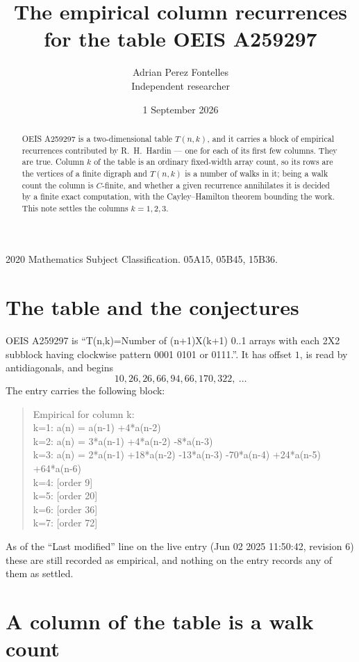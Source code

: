 \documentclass[11pt,a4paper]{article}
\title{The empirical column recurrences for the table OEIS A259297}
\author{Adrian Perez Fontelles\\ \small Independent researcher}
\date{1 September 2026}
\theoremstyle{plain}
\theoremstyle{definition}
\begin{document}
\maketitle

\begin{abstract}
OEIS A259297 is a two-dimensional table $T(n,k)$, and it carries a block of empirical
recurrences contributed by R.~H.~Hardin --- one for each of its first few columns. They are
true. Column $k$ of the table is an ordinary fixed-width array count, so its rows are the
vertices of a finite digraph and $T(n,k)$ is a number of walks in it; being a walk count the
column is $C$-finite, and whether a given recurrence annihilates it is decided by a finite
exact computation, with the Cayley--Hamilton theorem bounding the work. This note settles the columns $k=1, 2, 3$.
\end{abstract}

\noindent\small 2020 Mathematics Subject Classification. 05A15, 05B45, 15B36.\normalsize

\section{The table and the conjectures}

OEIS A259297 is ``T(n,k)=Number of (n+1)X(k+1) 0..1 arrays with each 2X2 subblock having clockwise pattern 0001 0101 or 0111.''. It has offset $1$, is
read by antidiagonals, and begins
\[
10, 26, 26, 66, 94, 66, 170, 322,\ \dots
\]
The entry carries the following block:
\begin{quote}\small
Empirical for column k:\\
k=1: a(n) = a(n-1) +4*a(n-2)\\
k=2: a(n) = 3*a(n-1) +4*a(n-2) -8*a(n-3)\\
k=3: a(n) = 2*a(n-1) +18*a(n-2) -13*a(n-3) -70*a(n-4) +24*a(n-5) +64*a(n-6)\\
k=4: [order 9]\\
k=5: [order 20]\\
k=6: [order 36]\\
k=7: [order 72]\\
\end{quote}
As of the ``Last modified'' line on the live entry (Jun 02 2025 11:50:42, revision 6) these are still
recorded as empirical, and nothing on the entry records any of them as settled.

\section{A column of the table is a walk count}
\end{document}
